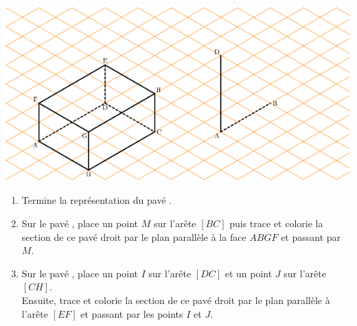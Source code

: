 
\includegraphics[scale=1]{RepS-37.png} 
\begin{enumerate}
\item Termine la représentation du pavé .
\item Sur le pavé , place un point $M$ sur l'arête
  $[BC]$ puis trace et colorie la section de ce pavé droit par le
  plan parallèle à la face $ABGF$ et passant par $M$.
\item Sur le pavé , place un point $I$ sur l'arête
  $[DC]$ et un point $J$ sur l'arête $[CH]$.\\Ensuite, trace et
  colorie la section de ce pavé droit par le plan parallèle à
  l'arête $[EF]$ et passant par les points $I$ et $J$.
\end{enumerate}

